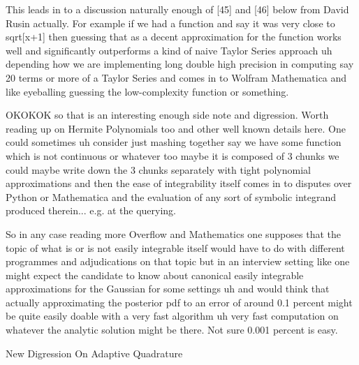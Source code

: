 This leads in to a discussion naturally enough of [45] and [46] below from David Rusin actually. For example if we had a function and say it was very close to sqrt[x+1] then guessing that as a decent approximation for the function works well and significantly outperforms a kind of naive Taylor Series approach uh depending how we are implementing long double high precision in computing say 20 terms or more of a Taylor Series and comes in to Wolfram Mathematica and like eyeballing guessing the low-complexity function or something.

OKOKOK so that is an interesting enough side note and digression. Worth reading up on Hermite Polynomials too and other well known details here. One could sometimes uh consider just mashing together say we have some function which is not continuous or whatever too maybe it is composed of 3 chunks we could maybe write down the 3 chunks separately with tight polynomial approximations and then the ease of integrability itself comes in to disputes over Python or Mathematica and the evaluation of any sort of symbolic integrand produced therein... e.g. at the querying.

So in any case reading more Overflow and Mathematics one supposes that the topic of what is or is not easily integrable itself would have to do with different programmes and adjudications on that topic but in an interview setting like one might expect the candidate to know about canonical easily integrable approximations for the Gaussian for some settings uh and would think that actually approximating the posterior pdf to an error of around 0.1 percent might be quite easily doable with a very fast algorithm uh very fast computation on whatever the analytic solution might be there. Not sure 0.001 percent is easy.

	New Digression On Adaptive Quadrature


